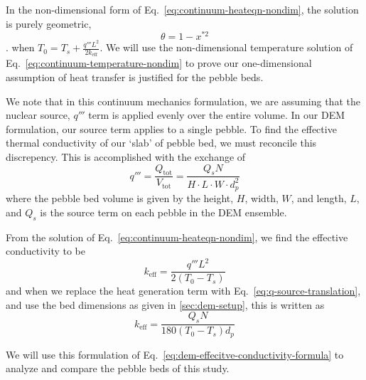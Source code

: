 In the non-dimensional form of Eq.~\ref{eq:continuum-heateqn-nondim}, the solution is purely geometric,
\begin{equation}\label{eq:continuum-temperature-nondim}
	\theta = 1-x^{*2}
\end{equation}. 
when $T_0 = T_s + \frac{q'''L^2}{2k_\text{eff}}$. We will use the non-dimensional temperature solution of Eq.~\ref{eq:continuum-temperature-nondim} to prove our one-dimensional assumption of heat transfer is justified for the pebble beds.

We note that in this continuum mechanics formulation, we are assuming that the nuclear source, $q'''$ term is applied evenly over the entire volume. In our DEM formulation, our source term applies to a single pebble. To find the effective thermal conductivity of our `slab' of pebble bed, we must reconcile this discrepency. This is accomplished with the exchange of
\begin{equation}\label{eq:q-source-translation}
	q''' = \frac{Q_\text{tot}}{V_\text{tot}} = \frac{Q_sN}{H\cdot L\cdot W\cdot d_p^2}
\end{equation}
where the pebble bed volume is given by the height, $H$, width, $W$, and length, $L$, and $Q_s$ is the source term on each pebble in the DEM ensemble. 

From the solution of Eq.~\ref{eq:continuum-heateqn-nondim}, we find the effective conductivity to be
\begin{equation}
	k_\text{eff} = \frac{q''' L^2}{2(T_0-T_s)}
\end{equation}
and when we replace the heat generation term with Eq.~\ref{eq:q-source-translation}, and use the bed dimensions as given in \cref{sec:dem-setup}, this is written as
\begin{equation}\label{eq:dem-effecitve-conductivity-formula}
	k_\text{eff} = \frac{Q_sN}{180(T_0-T_s)d_p}
\end{equation}

We will use this formulation of Eq.~\ref{eq:dem-effecitve-conductivity-formula} to analyze and compare the pebble beds of this study.

